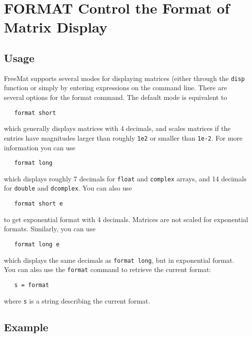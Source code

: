 \section{FORMAT Control the Format of Matrix Display}

\subsection{Usage}

FreeMat supports several modes for displaying matrices (either through the
\verb|disp| function or simply by entering expressions on the command line.  
There are several options for the format command.  The default mode is equivalent
to
\begin{verbatim}
   format short
\end{verbatim}
which generally displays matrices with 4 decimals, and scales matrices if the entries
have magnitudes larger than roughly \verb|1e2| or smaller than \verb|1e-2|.   For more 
information you can use 
\begin{verbatim}
   format long
\end{verbatim}
which displays roughly 7 decimals for \verb|float| and \verb|complex| arrays, and 14 decimals
for \verb|double| and \verb|dcomplex|.  You can also use
\begin{verbatim}
   format short e
\end{verbatim}
to get exponential format with 4 decimals.  Matrices are not scaled for exponential 
formats.  Similarly, you can use
\begin{verbatim}
   format long e
\end{verbatim}
which displays the same decimals as \verb|format long|, but in exponential format.
You can also use the \verb|format| command to retrieve the current format:
\begin{verbatim}
   s = format
\end{verbatim}
where \verb|s| is a string describing the current format.
\subsection{Example}

